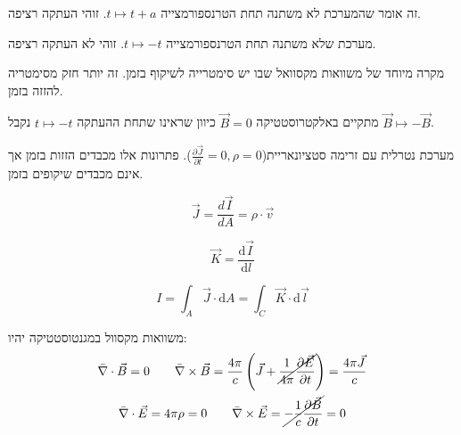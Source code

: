 \documentclass{tstextbook}
\begin{document}
\begin{definition}
זה אומר שהמערכת לא משתנה תחת הטרנספורמצייה \(t\mapsto t+a\). זוהי העתקה רציפה.

\end{definition}
\begin{definition}
מערכת שלא משתנה תחת הטרנספורמצייה \(t\mapsto -t\). זוהי לא העתקה רציפה.

\end{definition}
\begin{definition}[אלקטרוסטטיקה]
מקרה מיוחד של משוואות מקסוואל שבו יש סימטרייה לשיקוף בזמן. זה יותר חזק מסימטריה להזזה בזמן.

\end{definition}
\begin{corollary}
מתקיים באלקטרוסטטיקה \(\vec{B} = 0\) כיוון שראינו שתחת ההעתקה \(t\mapsto -t\) נקבל \(\vec{B}\mapsto-\vec{B}\).

\end{corollary}
\begin{definition}[מגנטוסטטיקה]
מערכת נטרלית עם זרימה סטציונאריית(\(\frac{\partial \vec{J}}{\partial t}=0,\rho=0\)). פתרונות אלו מכבדים הזזות בזמן אך אינם מכבדים שיקופים בזמן.

\end{definition}
\begin{definition}
$$\vec{J} = \frac{d\vec{I}}{dA}=\rho\cdot \vec{v}$$

\end{definition}
\begin{definition}
$$\vec{K}=\frac{\mathrm{d} \vec{I}}{\mathrm{d} l} $$

\end{definition}
\begin{definition}[זרם]
$$I=\int_{A}\vec{J}\cdot \mathrm{d}A=\int_{C}\vec{K}\cdot \mathrm{d}\vec{l}$$

\end{definition}
\begin{proposition}
משוואות מקסוול במגנטוסטטיקה יהיו:
$$\begin{gather}\bar{\nabla} \cdot \vec{B}=0 \qquad \bar{\nabla} \times  \vec{B} = \frac{4\pi}{c}\left( \vec{J}+\cancel{ \frac{1}{4\pi}\frac{\partial \vec{E}}{\partial t} }  \right)=\frac{4\pi \vec{J}}{c}\\\bar{\nabla} \cdot \vec{E} = 4\pi \rho = 0 \qquad 
\bar{\nabla} \times \vec{E} =  \cancel{ -\frac{1}{c}\frac{\partial \vec{B}}{\partial t} } =0 \end{gather}$$

\end{proposition}
\end{document}

